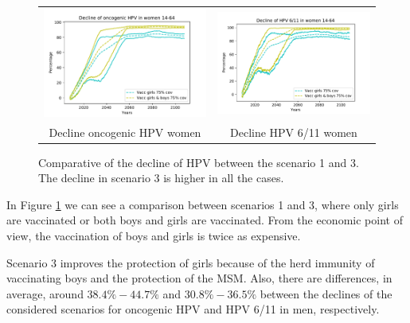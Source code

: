 \begin{figure}[!]
\begin{tabular}{cc}
		\includegraphics[width=0.5\linewidth]{IMGs/10.-Coste_efectividad/solo_muj_y_ambos/onco_muj.pdf}	& 
		\includegraphics[width=0.5\linewidth]{IMGs/10.-Coste_efectividad/solo_muj_y_ambos/verr_muj.pdf}  \\ 
		Decline oncogenic HPV women	& Decline HPV 6/11 women \\ 
	\end{tabular} 
	\caption{Comparative of the decline of HPV between the scenario 1 and 3. The decline in scenario 3 is higher in all the cases.}
	\label{fig:compara_1_2}
\end{figure}

In Figure \ref{fig:compara_1_2} we can see a comparison between scenarios 1 and 3, where only girls are vaccinated or both boys and girls are vaccinated. From the economic point of view, the vaccination of boys and girls is twice as expensive.

Scenario 3 improves the protection of girls because of the herd immunity of vaccinating boys and the protection of the MSM. Also, there are differences, in average, around $38.4\%-44.7\%$ and $30.8\%-36.5\%$ between the declines of the considered scenarios for oncogenic HPV and HPV 6/11 in men, respectively.

